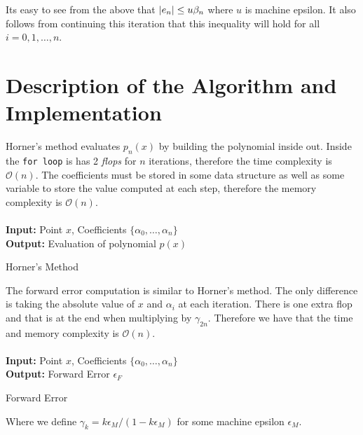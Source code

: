 \documentclass[12pt]{article}
\DeclarePairedDelimiter \abs{\lvert}{\rvert}%
\theoremstyle{remark}
\begin{document}
Its easy to see from the above that $\abs{e_n} \leq u\beta_n$ where $u$ is machine epsilon. It also follows from continuing this iteration that this inequality will hold for all $i = 0,1,\ldots,n$.

\section{Description of the Algorithm and Implementation}
Horner's method evaluates $p_n(x)$ by building the polynomial inside out. Inside the \texttt{for loop} is has 2 \textit{flops} for $n$ iterations, therefore the time complexity is $\mathcal{O}(n)$. The coefficients must be stored in some data structure as well as some variable to store the value computed at each step, therefore the memory complexity is $\mathcal{O}(n)$. \\ \\
\textbf{Input:} Point $x$, Coefficients $\{\alpha_0,\ldots,\alpha_n\}$ \\
\textbf{Output:} Evaluation of polynomial $p(x	)$
\vspace{-0.3cm}
\begin{algorithm}[H]
	\caption{Horner's Method}
	\begin{algorithmic}[1]
		\EndFor
	\end{algorithmic}
\end{algorithm}

The forward error computation is similar to Horner's method. The only difference is taking the absolute value of $x$  and $\alpha_i$ at each iteration. There is one extra flop and that is at the end when multiplying by $\gamma_{2n}$. Therefore we have that the time and memory complexity is $\mathcal{O}(n)$. \\ \\
\textbf{Input:} Point $x$, Coefficients $\{\alpha_0,\ldots,\alpha_n\}$ \\
\textbf{Output:} Forward Error $\epsilon_F$
\vspace{-0.3cm}
\begin{algorithm}[H]
	\caption{Forward Error}
	\begin{algorithmic}[1]
		\EndFor
	\end{algorithmic}
\end{algorithm}
\vspace{-0.65cm}
{\scriptsize Where we define $\gamma_{k} = k\epsilon_M/(1 - k\epsilon_M)$ for some machine epsilon $\epsilon_M$.} \\
\end{document}
